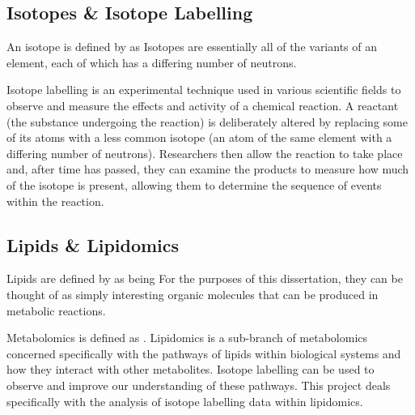 \documentclass{l4proj}
\begin{document}
\subsection{Isotopes \& Isotope Labelling}
An isotope is defined by \cite{isotope} as  Isotopes are essentially all of the variants of an element, each of which has a differing number of neutrons.

Isotope labelling is an experimental technique used in various scientific fields to observe and measure the effects and activity of a chemical reaction. A reactant (the substance undergoing the reaction) is deliberately altered by replacing some of its atoms with a less common isotope (an atom of the same element with a differing number of neutrons). Researchers then allow the reaction to take place and, after time has passed, they can examine the products to measure how much of the isotope is present, allowing them to determine the sequence of events within the reaction. 

\subsection{Lipids \& Lipidomics}
Lipids are defined by \cite{lipidDef19:online} as being  For the purposes of this dissertation, they can be thought of as simply interesting organic molecules that can be produced in metabolic reactions.

Metabolomics  is defined as  \citep{Metabolomics}. Lipidomics is a sub-branch of metabolomics concerned specifically with the pathways of lipids within biological systems and how they interact with other metabolites. Isotope labelling can be used to observe and improve our understanding of these pathways. This project deals specifically with the analysis of isotope labelling data within lipidomics.
\end{document}
